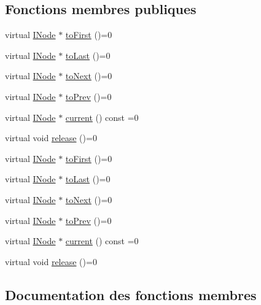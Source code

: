 \subsection*{Fonctions membres publiques}
\begin{DoxyCompactItemize}
\item 
virtual \hyperlink{class_i_node}{I\+Node} $\ast$ \hyperlink{class_i_node_iterator_ac7b3a8977f80aec8734dc28d4ba4919d}{to\+First} ()=0
\item 
virtual \hyperlink{class_i_node}{I\+Node} $\ast$ \hyperlink{class_i_node_iterator_ae28f1e6d24099d5cfa7e27b8ee0214c6}{to\+Last} ()=0
\item 
virtual \hyperlink{class_i_node}{I\+Node} $\ast$ \hyperlink{class_i_node_iterator_ab6ae57027122c245553a626af7d1f763}{to\+Next} ()=0
\item 
virtual \hyperlink{class_i_node}{I\+Node} $\ast$ \hyperlink{class_i_node_iterator_a484ecacf81a01d3c7400b019b23a74c3}{to\+Prev} ()=0
\item 
virtual \hyperlink{class_i_node}{I\+Node} $\ast$ \hyperlink{class_i_node_iterator_a18522439bc652fc3c22334aa42279300}{current} () const  =0
\item 
virtual void \hyperlink{class_i_node_iterator_a17249e1a53de824e53367fdb4ad7b201}{release} ()=0
\item 
virtual \hyperlink{class_i_node}{I\+Node} $\ast$ \hyperlink{class_i_node_iterator_ac7b3a8977f80aec8734dc28d4ba4919d}{to\+First} ()=0
\item 
virtual \hyperlink{class_i_node}{I\+Node} $\ast$ \hyperlink{class_i_node_iterator_ae28f1e6d24099d5cfa7e27b8ee0214c6}{to\+Last} ()=0
\item 
virtual \hyperlink{class_i_node}{I\+Node} $\ast$ \hyperlink{class_i_node_iterator_ab6ae57027122c245553a626af7d1f763}{to\+Next} ()=0
\item 
virtual \hyperlink{class_i_node}{I\+Node} $\ast$ \hyperlink{class_i_node_iterator_a484ecacf81a01d3c7400b019b23a74c3}{to\+Prev} ()=0
\item 
virtual \hyperlink{class_i_node}{I\+Node} $\ast$ \hyperlink{class_i_node_iterator_a18522439bc652fc3c22334aa42279300}{current} () const  =0
\item 
virtual void \hyperlink{class_i_node_iterator_a17249e1a53de824e53367fdb4ad7b201}{release} ()=0
\end{DoxyCompactItemize}


\subsection{Documentation des fonctions membres}
\hypertarget{class_i_node_iterator_a18522439bc652fc3c22334aa42279300}{}
